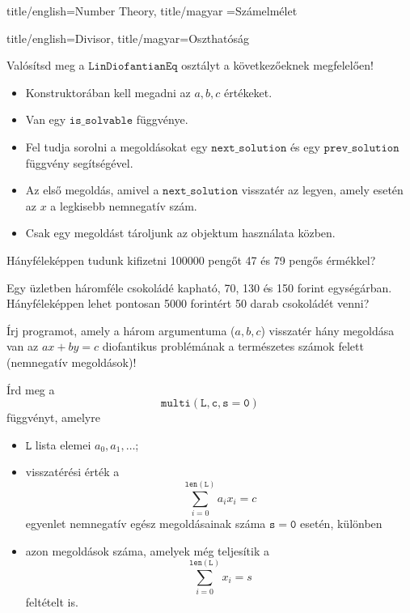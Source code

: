 \documentclass{amsbook}
\begin{document}
\begin{Part*}{
    title/english=Number Theory,
    title/magyar =Számelmélet}
\begin{Section}{
    title/english=Divisor,
    title/magyar=Oszthatóság}
  \begin{exercise} Valósítsd meg a $\mathtt{LinDiofantianEq}$ osztályt a
    következőeknek megfelelően!
    \begin{itemize}
      \item Konstruktorában kell megadni az $a,b,c$ értékeket.
      \item Van egy $\mathtt{is\_solvable}$ függvénye.
      \item Fel tudja sorolni a megoldásokat egy $\mathtt{next\_solution}$ és
        egy $\mathtt{prev\_solution}$ függvény segítségével.
      \item Az első megoldás, amivel a $\mathtt{next\_solution}$ visszatér az
        legyen, amely esetén az $x$ a legkisebb nemnegatív szám.
      \item Csak egy megoldást tároljunk az objektum használata közben.
    \end{itemize}
  \end{exercise}

  \begin{exercise}
    Hányféleképpen tudunk kifizetni 100000 peng\H ot 47 és 79 peng\H os
    érmékkel?
  \end{exercise}


  \begin{exercise}
    Egy üzletben háromféle csokoládé kapható, 70, 130 és 150 forint
    egységárban. Hányféleképpen lehet pontosan 5000 forintért 50 
    darab csokoládét venni?
  \end{exercise}
    
  \begin{exercise}
    Írj programot, amely a három argumentuma ($a,b,c$) visszatér hány
    megoldása van az $ax+by=c$ diofantikus problémának a természetes 
    számok felett (nemnegatív megoldások)!
  \end{exercise}

  \begin{exercise}
    Írd meg a \[ \mathtt{multi(L, c, s=0)} \]
    függvényt, amelyre
    \begin{itemize}
      \item $\mathtt{L}$ lista elemei $a_0,a_1,\dots$;
      \item visszatérési érték a \[ \sum_{i=0}^{\mathtt{len(L)}} a_ix_i = c \]
        egyenlet nemnegatív egész megoldásainak száma $\mathtt{s=0}$ esetén,
        különben
      \item azon megoldások száma, amelyek még teljesítik a 
        \[ \sum_{i=0}^{\mathtt{len(L)}} x_i = s \]
        feltételt is.
    \end{itemize}
  \end{exercise}
\end{Section}


\end{Part*}
\end{document}
